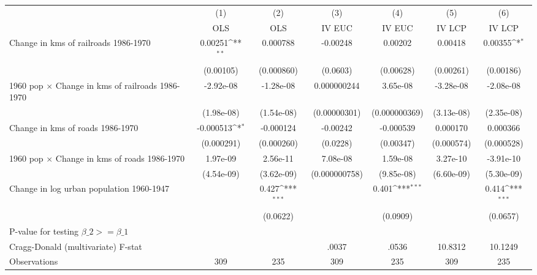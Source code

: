 {
\def\sym#1{\ifmmode^{#1}\else\(^{#1}\)\fi}
\begin{tabular}{l*{6}{c}}
\hline\hline
                &\multicolumn{1}{c}{(1)}&\multicolumn{1}{c}{(2)}&\multicolumn{1}{c}{(3)}&\multicolumn{1}{c}{(4)}&\multicolumn{1}{c}{(5)}&\multicolumn{1}{c}{(6)}\\
                &\multicolumn{1}{c}{OLS}&\multicolumn{1}{c}{OLS}&\multicolumn{1}{c}{IV EUC}&\multicolumn{1}{c}{IV EUC}&\multicolumn{1}{c}{IV LCP}&\multicolumn{1}{c}{IV LCP}\\
\hline
Change in kms of railroads 1986-1970&  0.00251\sym{**} & 0.000788         & -0.00248         &  0.00202         &  0.00418         &  0.00355\sym{*}  \\
                &(0.00105)         &(0.000860)         & (0.0603)         &(0.00628)         &(0.00261)         &(0.00186)         \\
[1em]
1960 pop $\times$ Change in kms of railroads 1986-1970&-2.92e-08         &-1.28e-08         &0.000000244         & 3.65e-08         &-3.28e-08         &-2.08e-08         \\
                &(1.98e-08)         &(1.54e-08)         &(0.00000301)         &(0.000000369)         &(3.13e-08)         &(2.35e-08)         \\
[1em]
Change in kms of roads 1986-1970&-0.000513\sym{*}  &-0.000124         & -0.00242         &-0.000539         & 0.000170         & 0.000366         \\
                &(0.000291)         &(0.000260)         & (0.0228)         &(0.00347)         &(0.000574)         &(0.000528)         \\
[1em]
1960 pop $\times$ Change in kms of roads 1986-1970& 1.97e-09         & 2.56e-11         & 7.08e-08         & 1.59e-08         & 3.27e-10         &-3.91e-10         \\
                &(4.54e-09)         &(3.62e-09)         &(0.000000758)         &(9.85e-08)         &(6.60e-09)         &(5.30e-09)         \\
[1em]
Change in log urban population 1960-1947&                  &    0.427\sym{***}&                  &    0.401\sym{***}&                  &    0.414\sym{***}\\
                &                  & (0.0622)         &                  & (0.0909)         &                  & (0.0657)         \\
\hline
P-value for testing $\beta\_{2} >= \beta\_{1}$&                  &                  &                  &                  &                  &                  \\
Cragg-Donald (multivariate) F-stat&                  &                  &    .0037         &    .0536         &  10.8312         &  10.1249         \\
Observations    &      309         &      235         &      309         &      235         &      309         &      235         \\
\hline\hline
\end{tabular}
}
